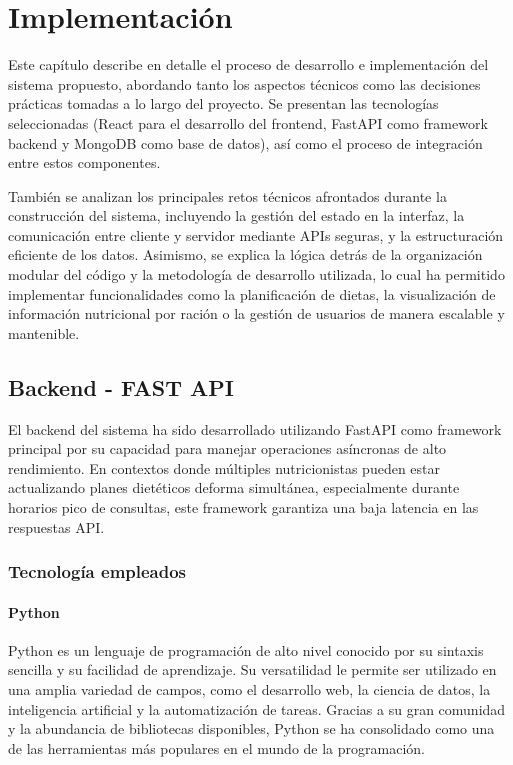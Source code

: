 \chapter{Implementación}\label{capitulo6}
Este capítulo describe en detalle el proceso de desarrollo e implementación del sistema propuesto, abordando tanto los aspectos técnicos como las decisiones prácticas tomadas a lo largo del proyecto. Se presentan las tecnologías seleccionadas (React para el desarrollo del frontend, FastAPI como framework backend y MongoDB como base de datos), así como el proceso de integración entre estos componentes. 

También se analizan los principales retos técnicos afrontados durante la construcción del sistema, incluyendo la gestión del estado en la interfaz, la comunicación entre cliente y servidor mediante APIs seguras, y la estructuración eficiente de los datos. Asimismo, se explica la lógica detrás de la organización modular del código y la metodología de desarrollo utilizada, lo cual ha permitido implementar funcionalidades como la planificación de dietas, la visualización de información nutricional por ración o la gestión de usuarios de manera escalable y mantenible.

\section{Backend - FAST API}
El backend del sistema ha sido desarrollado utilizando FastAPI como framework principal por su capacidad para manejar operaciones asíncronas de alto rendimiento. En contextos donde múltiples nutricionistas pueden estar actualizando planes dietéticos deforma simultánea, especialmente durante horarios pico de consultas, este
framework garantiza una baja latencia en las respuestas API.

\subsection{Tecnología empleados}
\subsubsection*{Python\cite{pythonDocs}}
Python es un lenguaje de programación de alto nivel conocido por su sintaxis sencilla y su facilidad de aprendizaje. Su versatilidad le permite ser utilizado en una amplia variedad de campos, como el desarrollo web, la ciencia de datos, la inteligencia artificial y la automatización de tareas. Gracias a su gran comunidad y la abundancia de bibliotecas disponibles, Python se ha consolidado como una de las herramientas más populares en el mundo de la programación.

